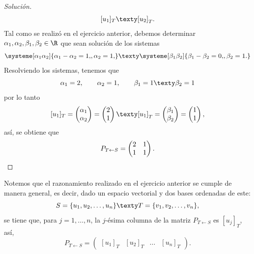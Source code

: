 \documentclass[a4,11pt]{aleph-notas}
\begin{document}
\begin{proof}[Solución]
    \[
        [u_1]_T
        \texty
        [u_2]_T.
    \]
    Tal como se realizó en el ejercicio anterior, debemos determinar $\alpha_1,\alpha_2,\beta_1,\beta_2\in\R$ que sean solución de los sistemas
    \[
        \systeme[\alpha_1\alpha_2]{
        \alpha_1 - \alpha_2 = 1{,},
        \alpha_2 = 1{,}
        }
        \texty
        \systeme[\beta_1\beta_2]{
        \beta_1 - \beta_2 = 0{,},
        \beta_2 = 1{.}
        }
    \]
    Resolviendo los sistemas, tenemos que
    \[
        \alpha_1 = 2,\qquad
        \alpha_2 = 1,\qquad
        \beta_1 = 1\texty
        \beta_2 = 1
    \]
    por lo tanto
    \[
        [u_1]_T 
        = \begin{pmatrix} \alpha_1\\ \alpha_2 \end{pmatrix}
        = \begin{pmatrix} 2\\ 1  \end{pmatrix}
        \texty
        [u_1]_T 
        = \begin{pmatrix} \beta_1\\ \beta_2 \end{pmatrix}
        = \begin{pmatrix} 1\\ 1  \end{pmatrix},
    \]
    así, se obtiene que
    \[
         P_{T \leftarrow S} = 
         \begin{pmatrix} 2 & 1\\ 1 & 1 \end{pmatrix}.\qedhere
    \]
\end{proof}


\begin{advertencia}
    Notemos que el razonamiento realizado en el ejercicio anterior se cumple de manera general, es decir, dado un espacio vectorial y dos bases ordenadas de este:
    \[
        S = \{u_1,u_2,\ldots,u_n\}
        \texty
        T = \{v_1,v_2,\ldots,v_n\},
    \]
    se tiene que, para $j=1,\ldots,n$, la $j$-ésima columna de la matriz $P_{T\leftarrow S}$ es $[u_j]_T$, así,
    \[
        P_{T\leftarrow S} = 
        \begin{pmatrix}
        [u_1]_T & [u_2]_T & \ldots & [u_n]_T
        \end{pmatrix}.
    \]
\end{advertencia}
\end{document}
